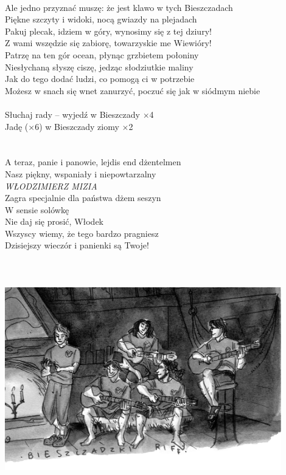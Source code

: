 \documentclass[a5paper, 10pt]{book}
\begin{document}
\newpage
\begin{minipage}[t]{1\textwidth}
~\\
Ale jedno przyznać muszę: że jest klawo w tych Bieszczadach\\
Piękne szczyty i widoki, nocą gwiazdy na plejadach\\
Pakuj plecak, idziem w góry, wynosimy się z tej dziury!\\
Z wami wszędzie się zabiorę, towarzyskie me Wiewióry!\\
\hspace*{3mm}Patrzę na ten gór ocean, płynąc grzbietem połoniny\\
\hspace*{3mm}Niesłychaną słyszę ciszę, jedząc słodziutkie maliny\\
\hspace*{3mm}Jak do tego dodać ludzi, co pomogą ci w potrzebie\\
\hspace*{3mm}Możesz w snach się wnet zanurzyć, poczuć się jak w siódmym niebie\\
\\
\hspace*{10mm}Słuchaj rady – wyjedź w Bieszczady $\times$4\\
\hspace*{10mm}Jadę ($\times$6) w Bieszczady ziomy $\times$2\\
\\
\\
A teraz, panie i panowie, lejdis end dżentelmen\\
Nasz piękny, wspaniały i niepowtarzalny\\
\hspace*{4mm}\textit{\large WŁODZIMIERZ MIZIA}\\
Zagra specjalnie dla państwa dżem seszyn\\
W sensie solówkę\\
Nie daj się prosić, Włodek\\
Wszyscy wiemy, że tego bardzo pragniesz\\
Dzisiejszy wieczór i panienki są Twoje!\\
\\
\\
\\
\includegraphics[width=12cm]{images/bieszczadzki_riff.png}
\end{minipage}
\end{document}
